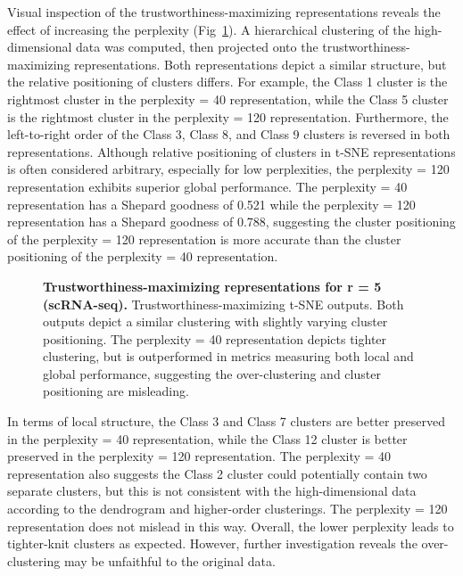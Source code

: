 \documentclass[10pt,letterpaper]{article}
\begin{document}
Visual inspection of the trustworthiness-maximizing representations reveals the effect of increasing the perplexity (Fig~\ref{fig11}). A hierarchical clustering of the high-dimensional data was computed, then projected onto the trustworthiness-maximizing representations. Both representations depict a similar structure, but the relative positioning of clusters differs. For example, the Class 1 cluster is the rightmost cluster in the perplexity = 40 representation, while the Class 5 cluster is the rightmost cluster in the perplexity = 120 representation. Furthermore, the left-to-right order of the Class 3, Class 8, and Class 9 clusters is reversed in both representations. Although relative positioning of clusters in t-SNE representations is often considered arbitrary, especially for low perplexities, the perplexity = 120 representation exhibits superior global performance. The perplexity = 40 representation has a Shepard goodness of 0.521 while the perplexity = 120 representation has a Shepard goodness of 0.788, suggesting the cluster positioning of the perplexity = 120 representation is more accurate than the cluster positioning of the perplexity = 40 representation.

\begin{figure}[!h]
\caption{{\bf Trustworthiness-maximizing representations for r = 5 (scRNA-seq).}
Trustworthiness-maximizing t-SNE outputs. Both outputs depict a similar clustering with slightly varying cluster positioning. The perplexity = 40 representation depicts tighter clustering, but is outperformed in metrics measuring both local and global performance, suggesting the over-clustering and cluster positioning are misleading.}
\label{fig11}
\end{figure}

In terms of local structure, the Class 3 and Class 7 clusters are better preserved in the perplexity = 40 representation, while the Class 12 cluster is better preserved in the perplexity = 120 representation. The perplexity = 40 representation also suggests the Class 2 cluster could potentially contain two separate clusters, but this is not consistent with the high-dimensional data according to the dendrogram and higher-order clusterings. The perplexity = 120 representation does not mislead in this way. Overall, the lower perplexity leads to tighter-knit clusters as expected. However, further investigation reveals the over-clustering may be unfaithful to the original data.
\end{document}
